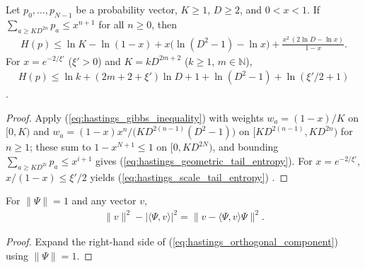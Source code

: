 \begin{lemma}
    \label{thm:hastings_geometric_tail_entropy}
    \leanok
    Let $p_0,\dots,p_{N-1}$ be a probability vector, $K\ge1$, $D\ge2$, and
    $0<x<1$. If $\sum_{a\ge KD^{2n}}p_a\le x^{n+1}$ for all $n\ge0$, then
    \begin{align}
        H(p)\le\ln K-\ln(1-x)+x\bigl(\ln(D^2-1)-\ln x\bigr)
        +\frac{x^2\,(2\ln D-\ln x)}{1-x}.
        \label{eq:hastings_geometric_tail_entropy}
    \end{align}
    For $x=e^{-2/\xi'}$ ($\xi'>0$) and $K=kD^{2m+2}$ ($k\ge1$, $m\in\mathbb N$),
    \begin{align}
        H(p)\le\ln k+(2m+2+\xi')\ln D+1+\ln(D^2-1)+\ln(\xi'/2+1)
        \label{eq:hastings_scale_tail_entropy}
    \end{align}
    \cite[Lemma~2, lines 357--390]{Hastings2007AreaLaw}.
\end{lemma}
\begin{proof}\leanok
    Apply (\ref{eq:hastings_gibbs_inequality}) with weights
    $w_a=(1-x)/K$ on $[0,K)$ and
    $w_a=(1-x)x^n/\bigl(KD^{2(n-1)}(D^2-1)\bigr)$ on $[KD^{2(n-1)},KD^{2n})$
    for $n\ge1$; these sum to $1-x^{N+1}\le1$ on $[0,KD^{2N})$, and bounding
    $\sum_{a\ge KD^{2i}}p_a\le x^{i+1}$ gives
    (\ref{eq:hastings_geometric_tail_entropy}). For $x=e^{-2/\xi'}$,
    $x/(1-x)\le\xi'/2$ yields (\ref{eq:hastings_scale_tail_entropy})
    \cite[lines 386--389]{Hastings2007AreaLaw}.
\end{proof}

\begin{lemma}
    \label{thm:hastings_orthogonal_component}
    \leanok
    For $\|\Psi\|=1$ and any vector $v$,
    \begin{align}
        \|v\|^2-|\langle\Psi,v\rangle|^2=\bigl\|v-\langle\Psi,v\rangle\Psi\bigr\|^2.
        \label{eq:hastings_orthogonal_component}
    \end{align}
\end{lemma}
\begin{proof}\leanok
    Expand the right-hand side of (\ref{eq:hastings_orthogonal_component}) using
    $\|\Psi\|=1$.
\end{proof}

